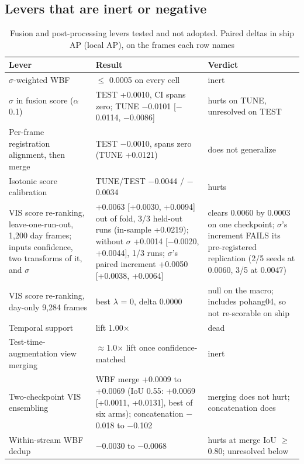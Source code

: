 \documentclass[journal,onecolumn]{IEEEtran}
\begin{document}
\subsection{Levers that are inert or negative}\label{app:E.4}
\begin{table}[htbp]
\centering
\footnotesize
\caption{Fusion and post-processing levers tested and not adopted. Paired deltas in ship AP (local AP), on the frames each row names}
\label{tab:14}
\begin{tabularx}{\linewidth}{>{\raggedright\arraybackslash}X>{\raggedright\arraybackslash}X>{\raggedright\arraybackslash}X}
\toprule
Lever & Result & Verdict \\
\midrule
$\sigma$-weighted WBF \textdagger{} & $\leq$ 0.0005 on every cell & inert \\
$\sigma$ in fusion score ($\alpha$ 0.1) & TEST +0.0010, CI spans zero; TUNE $-$0.0101 [$-$0.0114, $-$0.0086] & hurts on TUNE, unresolved on TEST \\
Per-frame registration alignment, then merge & TEST $-$0.0010, spans zero (TUNE +0.0121) & does not generalize \\
Isotonic score calibration & TUNE/TEST $-$0.0044 / $-$0.0034 & hurts \\
VIS score re-ranking, leave-one-run-out, 1,200 day frames; inputs confidence, two transforms of it, and $\sigma$ \textdagger{} & +0.0063 [+0.0030, +0.0094] out of fold, 3/3 held-out runs (in-sample +0.0219); without $\sigma$ +0.0014 [$-$0.0020, +0.0044], 1/3 runs; $\sigma$'s paired increment +0.0050 [+0.0038, +0.0064] & clears 0.0060 by 0.0003 on one checkpoint; $\sigma$'s increment FAILS its pre-registered replication (2/5 seeds at 0.0060, 3/5 at 0.0047) \\
VIS score re-ranking, day-only 9,284 frames \textdaggerdbl{} & best $\lambda$ = 0, delta 0.0000 & null on the macro; includes pohang04, so not re-scorable on ship \\
Temporal support \textdagger{} & lift 1.00$\times$ & dead \\
Test-time-augmentation view merging \textdagger{} & $\approx$1.0$\times$ lift once confidence-matched & inert \\
Two-checkpoint VIS ensembling \textdagger{} & WBF merge +0.0009 to +0.0069 (IoU 0.55: +0.0069 [+0.0011, +0.0131], best of six arms); concatenation $-$0.018 to $-$0.102 & merging does not hurt; concatenation does \\
Within-stream WBF dedup \textdagger{} & $-$0.0030 to $-$0.0068 & hurts at merge IoU $\geq$ 0.80; unresolved below \\

\end{tabularx}
\end{table}
\end{document}

